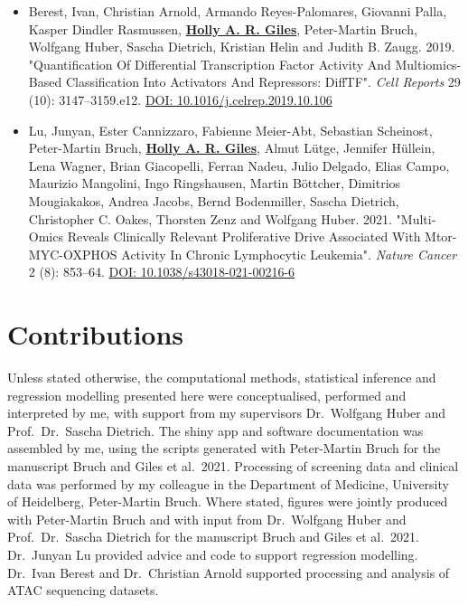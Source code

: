 \documentclass[11pt, a4paper, twosided]{book}
\begin{document}
    \begin{itemize}
        \item Berest, Ivan\ast, Christian Arnold\ast, Armando Reyes-Palomares, Giovanni Palla, Kasper Dindler Rasmussen, \textbf{\underline{Holly A. R. Giles}}, Peter-Martin Bruch, Wolfgang Huber, Sascha Dietrich, Kristian Helin and Judith B. Zaugg. 2019. "Quantification Of Differential Transcription Factor Activity And Multiomics-Based Classification Into Activators And Repressors: DiffTF". \textit{Cell Reports} 29 (10): 3147–3159.e12. \href{https://doi.org/10.1016/j.celrep.2019.10.106}{DOI: 10.1016/j.celrep.2019.10.106}
        
      \item Lu, Junyan\ast, Ester Cannizzaro\ast, Fabienne Meier-Abt, Sebastian Scheinost, Peter-Martin Bruch, \textbf{\underline{Holly A. R. Giles}}, Almut Lütge, Jennifer Hüllein, Lena Wagner, Brian Giacopelli, Ferran Nadeu, Julio Delgado, Elias Campo, Maurizio Mangolini, Ingo Ringshausen, Martin Böttcher, Dimitrios Mougiakakos, Andrea Jacobs, Bernd Bodenmiller, Sascha Dietrich, Christopher C. Oakes, Thorsten Zenz and Wolfgang Huber.  2021. "Multi-Omics Reveals Clinically Relevant Proliferative Drive Associated With Mtor-MYC-OXPHOS Activity In Chronic Lymphocytic Leukemia". \textit{Nature Cancer} 2 (8): 853–64. \href{https://doi.org/10.1038/s43018-021-00216-6}{DOI: 10.1038/s43018-021-00216-6}
    \end{itemize}
\newpage\null\newpage

    \hypertarget{contributions}{%
    \chapter*{Contributions}\label{contributions}}

    Unless stated otherwise, the computational methods, statistical inference and regression modelling presented here were conceptualised, performed and interpreted by me, with support from my supervisors Dr.~Wolfgang Huber and Prof.~Dr.~Sascha Dietrich. The shiny app and software documentation was assembled by me, using the scripts generated with Peter-Martin Bruch for the manuscript Bruch and Giles et al.~2021. Processing of screening data and clinical data was performed by my colleague in the Department of Medicine, University of Heidelberg, Peter-Martin Bruch. Where stated, figures were jointly produced with Peter-Martin Bruch and with input from Dr.~Wolfgang Huber and Prof.~Dr.~Sascha Dietrich for the manuscript Bruch and Giles et al.~2021. Dr.~Junyan Lu provided advice and code to support regression modelling. Dr.~Ivan Berest and Dr.~Christian Arnold supported processing and analysis of ATAC sequencing datasets.
\end{document}
